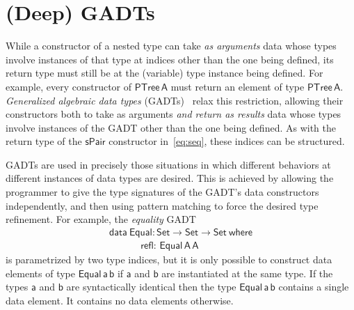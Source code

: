 \documentclass[9pt]{entcs}
\begin{document}
\section{(Deep) GADTs}\label{sec:GADTs}

While a constructor of a nested type can take {\em as arguments} data
whose types involve instances of that type at indices other than the
one being defined, its return type must still be at the (variable)
type instance being defined. For example, every constructor of
$\mathsf{PTree\,A}$ must return an element of type
$\mathsf{PTree\,A}$. \emph{Generalized algebraic data types}
(GADTs)~\cite{ch03,sp04,xcc03} relax this restriction, allowing their
constructors both to take as arguments \emph{and return as results}
data whose types involve instances of the GADT other than the one
being defined. As with the return type of the $\mathsf{sPair}$
constructor in~\eqref{eq:seq}, these indices can be structured.

GADTs are used in precisely those situations in which different
behaviors at different instances of data types are desired. This is
achieved by allowing the programmer to give the type signatures of the
GADT's data constructors independently, and then using {\color{red}
  pattern matching} to force the desired type refinement. For example,
the {\em equality} GADT
\begin{equation}\label{eq:equal}
\begin{array}{l}
\mathsf{data\ Equal : Set \to Set \to Set\ where}\\
\mathsf{\;\;\;\;\;\;\;\;\;\;\;\,refl :\, Equal\,A\,A}
\end{array}
\end{equation}
is parametrized by two type indices, but it is only possible to
construct data elements of type $\mathsf{Equal\,a\,b}$ if $\mathsf{a}$
and $\mathsf{b}$ are instantiated at the same type. If the types
$\mathsf{a}$ and $\mathsf{b}$ are syntactically identical then the
type $\mathsf{Equal\,a\,b}$ contains a single data element. It
contains no data elements otherwise.
\end{document}
